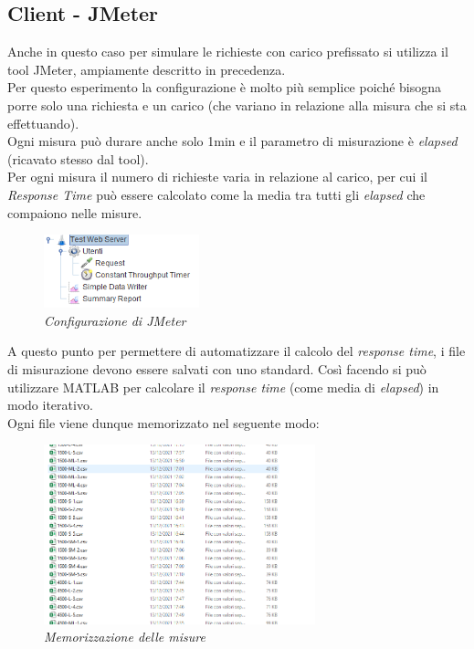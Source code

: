 \subsection{Client - JMeter}
Anche in questo caso per simulare le richieste con carico prefissato si utilizza il tool JMeter, ampiamente descritto in precedenza.
\\Per questo esperimento la configurazione è molto più semplice poiché bisogna porre solo una richiesta e un carico (che variano in relazione alla misura che si sta effettuando).
\\Ogni misura può durare anche solo 1min e il parametro di misurazione è \textit{elapsed} (ricavato stesso dal tool).
\\Per ogni misura il numero di richieste varia in relazione al carico, per cui il \textit{Response Time} può essere calcolato come la media tra tutti gli \textit{elapsed} che compaiono nelle misure.  
\begin{figure}[H]
	\centering
	\includegraphics[width=0.4\textwidth]{img/hw4/jmeter.png}
	\caption{\textit{Configurazione di JMeter}}
\end{figure}
\vspace{0.5cm}
A questo punto per permettere di automatizzare il calcolo del \textit{response time}, i file di misurazione devono essere salvati con uno standard. Così facendo si può utilizzare MATLAB per calcolare il \textit{response time} (come media di \textit{elapsed}) in modo iterativo.
\\Ogni file viene dunque memorizzato nel seguente modo:
\begin{figure}[H]
	\centering
	\includegraphics[width=0.7\textwidth]{img/hw4/file.png}
	\caption{\textit{Memorizzazione delle misure}}
\end{figure}
